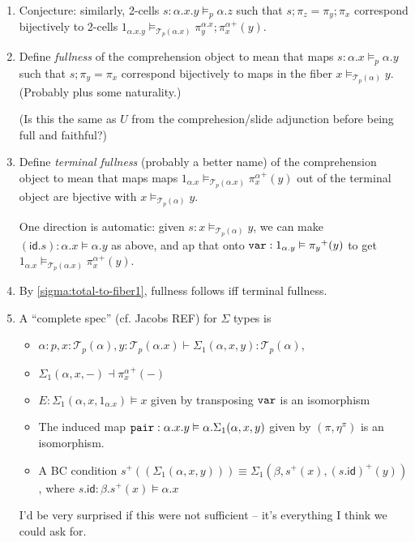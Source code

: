 \documentclass[10pt]{article}
\theoremstyle{definition}
\newcommand{\id}{\mathsf{id}}
\newcommand\TrPlus[2]{\ensuremath{{#1}^+(#2)}}
\newcommand\El[2]{\mathcal{T}_{#1}(#2)}
\begin{document}
\begin{enumerate}
\item \label{sigma:total-to-fiber2} Conjecture: similarly, 2-cells $s :
  \alpha.x.y \vDash_p \alpha.z$ such that $s;\pi_z = \pi_y;\pi_x$
  correspond bijectively to 2-cells $1_{\alpha.x.y}
  \vDash_{\El{p}{\alpha.x}} \TrPlus{\pi^{\alpha.x}_y;\pi^\alpha_x}{y}$.

\item \label{sigma:full} Define \emph{fullness} of the comprehension
  object to mean that maps $s : \alpha.x \vDash_p \alpha.y$ such that
  $s;\pi_y = \pi_x$ correspond bijectively to maps in the fiber $x
  \vDash_{\El{p}{\alpha}} y$.  (Probably plus some naturality.)

  (Is this the same as $U$ from the comprehesion/slide adjunction before
  being full and faithful?)

\item \label{sigma:full-interesting} Define \emph{terminal fullness}
  (probably a better name) of the comprehension object to mean that maps
  maps $1_{\alpha.x} \vDash_{\El{p}{\alpha.x}} \TrPlus{\pi^\alpha_x}{y}$
  out of the terminal object are bjective with $x
  \vDash_{\El{p}{\alpha}} y$.

  One direction is automatic: given $s : x \vDash_{\El{p}{\alpha}} y$,
  we can make $(\id.s) : \alpha.x \vDash \alpha.y$ as above, and ap that
  onto $\mtt{var} : 1_{\alpha.y} \vDash \TrPlus{\pi_y}{y}$ to get
  $1_{\alpha.x} \vDash_{\El{p}{\alpha.x}} \TrPlus{\pi^\alpha_x}{y}$.

\item By \ref{sigma:total-to-fiber1}, fullness follows iff terminal
  fullness.  
  
\item \label{sigma:complete}

  A ``complete spec'' (cf. Jacobs REF) for $\Sigma$ types is
  \begin{itemize}
  \item $\alpha : p, x : \El{p}{\alpha}, y : \El{p}{\alpha.x} \vdash \Sigma_1(\alpha,x,y) : \El{p}{\alpha}$,
  \item $\Sigma_1(\alpha,x,-) \dashv \TrPlus{\pi^\alpha_x}{-}$
  \item $E : \Sigma_1(\alpha,x,1_{\alpha.x}) \vDash x$ given by
    transposing $\mathtt{var}$ is an isomorphism
  \item The induced map $\mathtt{pair} : \alpha.x.y \vDash
    \alpha.\Sigma_1(\alpha,x,y)$ given by $(\pi, \eta^\pi)$ is an
    isomorphism.
  \item A BC condition $\TrPlus{s}{(\Sigma_1(\alpha,x,y))} \equiv
    \Sigma_1(\beta,\TrPlus{s}{x}, \TrPlus{(s . \id)}{y})$,
    where $s.\id : \beta.\TrPlus{s}{x} \vDash \alpha.x$
  \end{itemize}
  I'd be very surprised if this were not sufficient -- it's everything I
  think we could ask for.


\end{enumerate}
\end{document}
